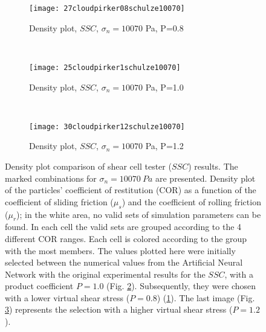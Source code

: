\documentclass{llncs}
\begin{document}
\begin{figure}[htp] \centering

    \begin{subfigure}[b]{0.8\columnwidth}
        \texttt{[image: 27cloudpirker08schulze10070]}
        \caption{Density plot, $SSC$, $\sigma_n=10070$ Pa, P=0.8}
        \label{fig:27cloudpirker08schulze10070} 
    \end{subfigure}\\
    \begin{subfigure}[b]{0.8\columnwidth}
        \texttt{[image: 25cloudpirker1schulze10070]}
        \caption{Density plot, $SSC$, $\sigma_n=10070$ Pa, P=1.0}
        \label{fig:25cloudpirker1schulze10070}
    \end{subfigure}\\

    \begin{subfigure}[b]{0.8\columnwidth}
        \texttt{[image: 30cloudpirker12schulze10070]}
        \caption{Density plot, $SSC$, $\sigma_n=10070$ Pa, P=1.2}
        \label{fig:30cloudpirker12schulze10070} 
    \end{subfigure}
    \caption[Density plot comparison of SSC results]{Density plot comparison of
    shear cell tester ($SSC$) results. The marked combinations for
    $\sigma_n=10070 ~Pa$ are presented.
    Density plot of the particles' coefficient of restitution (COR) as a
    function of the coefficient of sliding friction ($\mu_s$) and the
    coefficient of rolling friction ($\mu_r$); 
    in the white area, no valid sets of simulation parameters can be found.
	In each cell the valid sets are grouped according to the 4 different COR
	ranges.
	Each cell is colored according to the group with the most members. 
    The values plotted here were initially
    selected between the numerical
    values from the Artificial Neural Network with the original
    experimental results for the $SSC$, with a product coefficient $P=1.0$ (Fig.
    \ref{fig:25cloudpirker1schulze10070}). 
    Subsequently, they were chosen with  
    a lower virtual shear stress ($P=0.8$)
    (\ref{fig:27cloudpirker08schulze10070}).
    The last image (Fig. \ref{fig:30cloudpirker12schulze10070}) represents
    the selection with a higher virtual shear stress ($P=1.2$).    }
    \label{fig:29schulzeradarandcloud}
\end{figure}
\end{document}

